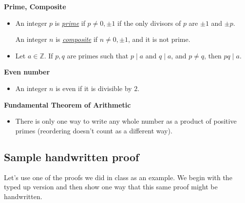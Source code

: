\documentclass[11pt]{article}
\newcommand{\Z}{\mathbb{Z}}
\newcommand\divides{\;|\;}
\theoremstyle{definition}
\begin{document}
{\bf Prime, Composite} 
\vspace*{-6pt}
\begin{itemize} 
\item An integer $p$ is \underline{{\it prime}} if $p\neq 0, \pm1 $ if the only divisors of $p$ are $\pm 1$ and $\pm p$. 

An integer $n$ is \underline{\it composite} if $n\neq 0, \pm 1$, and it is not prime.

\item Let $a\in \Z$. If $p,q$ are primes such that $p\divides a$ and $q\divides a$, and $p\neq q$, then $pq\divides a$.
\end{itemize}

{\bf Even number}
\vspace*{-6pt}
\begin{itemize} 
\item[] An integer $n$ is even if it is divisible by $2$.
\end{itemize}

{\bf Fundamental Theorem of Arithmetic} 
\vspace*{-6pt}
\begin{itemize}\item[] There is only one way to write any whole number as a product of positive primes (reordering doesn't count as a different way).
\end{itemize}



\newpage
\subsection{Sample handwritten proof}
\label{s: sample handwritten proof}

Let's use one of the proofs we did in class as an example.  We begin with the typed up version and then show one way that this same proof might be handwritten.
\end{document}
